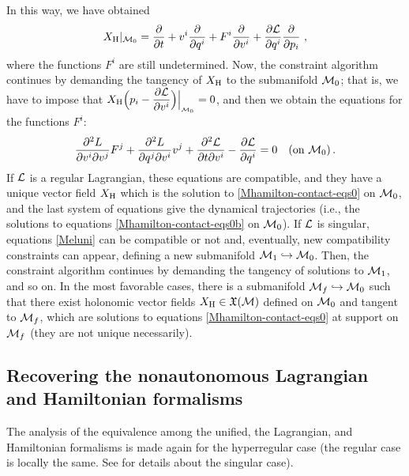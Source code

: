 \documentclass[12pt]{report}
\def\beq{\begin{equation}}
\def\eeq{\end{equation}}
\def\dst{\displaystyle}
\def\derpar#1#2{\frac{\partial{#1}}{\partial{#2}}}
\def\vf{\mathfrak X}
\def\Lag{{\cal L}}
\begin{document}
In this way, we have obtained
$$
X_{\rm H} \vert_{{\cal M}_0}= 
\derpar{}{t}+v^i\derpar{}{q^i}+F^i\derpar{}{v^i}+
\derpar{\Lag}{q^i}\derpar{}{p_i}\ ,
$$
where the functions $F^i$ are still undetermined.
Now, the constraint algorithm continues by demanding the tangency of
$X_{\rm H}$ to the submanifold ${\cal M}_0$; that is, we have
to impose that
$\dst{X_{\rm H}\Big(p_i- \derpar{\Lag}{v^i}\Big)}\Big\vert_{_{{\cal M}_0}} = 0$,
and then we obtain the equations for the functions $F^i$:
\beq
 \frac{\partial^2L}{\partial v^i\partial v^j}F^j+ \frac{\partial^2L}{\partial q^j\partial v^i}v^j+\frac{\partial^2\Lag}{\partial t\partial v^i}- \derpar{\Lag}{q^i}=0 \quad (\text{on } \mathcal{M}_0)  \, .
\label{Meluni}
\eeq
If $\Lag$ is a regular Lagrangian, these equations are compatible, and they have a unique vector field $X_{\rm H}$ which is the solution to \eqref{Mhamilton-contact-eqs0} on ${\cal M}_0$,
and the last system of equations give the dynamical trajectories
(i.e., the solutions to equations \eqref{Mhamilton-contact-eqs0b}
on ${\cal M}_0$).
If $\Lag$ is singular, equations \eqref{Meluni} can be compatible or not
and, eventually, new compatibility constraints can appear,
defining a new submanifold ${\cal M}_1\hookrightarrow{\cal M}_0$.
Then, the constraint algorithm continues by demanding 
the tangency of solutions to ${\cal M}_1$, and so on. 
In the most favorable cases,
there is a submanifold ${\cal M}_f \hookrightarrow {\cal M}_0$ 
such that there exist holonomic vector fields $X_{\rm H}\in\vf({\cal M})$ defined on ${\cal M}_0$ and tangent to ${\cal M}_f$,
which are solutions to equations \eqref{Mhamilton-contact-eqs0}
at support on ${\cal M}_f$ (they are not unique necessarily).


\subsection{Recovering the nonautonomous Lagrangian and Hamiltonian formalisms}


The analysis of the equivalence among the unified, the Lagrangian, and Hamiltonian formalisms is made again
for the hyperregular case (the regular case is locally the same.
See \cite{BEMMR-2008} for details about the singular case).
\end{document}
